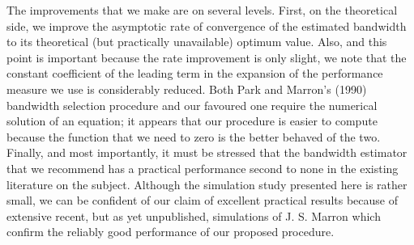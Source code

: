 \documentclass[11pt]{article}
\begin{document}
The improvements that we make are on several levels. First, on the theoretical side, we improve the asymptotic rate of convergence of the estimated bandwidth to its theoretical (but practically unavailable) optimum value. Also, and this point is important because the rate improvement is only slight, we note that the constant coefficient of the leading term in the expansion of the performance measure we use is considerably reduced. Both Park and Marron's (1990) bandwidth selection procedure and our favoured one require the numerical solution of an equation; it appears that our procedure is easier to compute because the function that we need to zero is the better behaved of the two. Finally, and most importantly, it must be stressed that the bandwidth estimator that we recommend has a practical performance second to none in the existing literature on the subject. Although the simulation study presented here is rather small, we can be confident of our claim of excellent practical results because of extensive recent, but as yet unpublished, simulations of J. S. Marron which confirm the reliably good performance of our proposed procedure.
\end{document}
